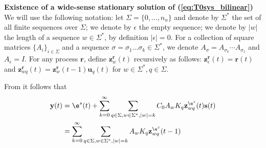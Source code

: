 \documentclass{ifacconf}
\def\eqref#1{(\ref{#1})}
\def\rvu{{\mathbf{i}}}
\def\rvr{{\mathbf{r}}}
\def\rvs{{\mathbf{s}}}
\def\rvu{{\mathbf{u}}}
\def\rvy{{\mathbf{y}}}
\def\rvz{{\mathbf{z}}}
\begin{document}
 \textbf{Existence of a wide-sense stationary solution of \eqref{eq:T0sys_bilinear}}
We will use the following notation: let $\Sigma=\{0,\ldots,n_u\}$ and denote by $\Sigma^{*}$ the set of all finite sequences over $\Sigma$;
  we denote by $\epsilon$ the empty sequence; we denote by $|w|$ the length of a sequence $w \in \Sigma^*$, by definition $| \epsilon | = 0$. For a collection of square matrices $\{A_i\}_{i \in \Sigma}$ and a sequence $\sigma=\sigma_1\ldots\sigma_k \in \Sigma^*$, we denote $A_{\sigma}=A_{\sigma_k}\cdots A_{\sigma_1}$ and $A_{\epsilon}=I$.
  For any process $\rvr$, define $\rvz_w^{\rvr}(t)$ recursively as follows: $\rvz^{\rvr}_{\epsilon}(t)=\rvr(t)$ and $\rvz^{\rvr}_{wq}(t)=\rvz^{\rvr}_{w}(t-1)\rvu_q(t)$ for $w \in \Sigma^*, q \in \Sigma$.

  From \cite{TAC:MPRV} it follows that 
  \begin{equation}
    \label{eq:bilinear_output}
    \begin{aligned}
      \rvy(t)&=\e^s(t)+\sum_{k=0}^{\infty} \sum_{q\in \Sigma, w \in \Sigma^*, |w|=k} C_0 A_w K_q \rvz^{\e^s}_{wq}(t)
      \rvs(t)\\
      & = \sum_{k=0}^{\infty} \sum_{q \in \Sigma, w \in \Sigma^*, |w|=k} A_wK_q \rvz^{\e^s}_{wq}(t-1)
    \end{aligned}
  \end{equation}
\end{document}
